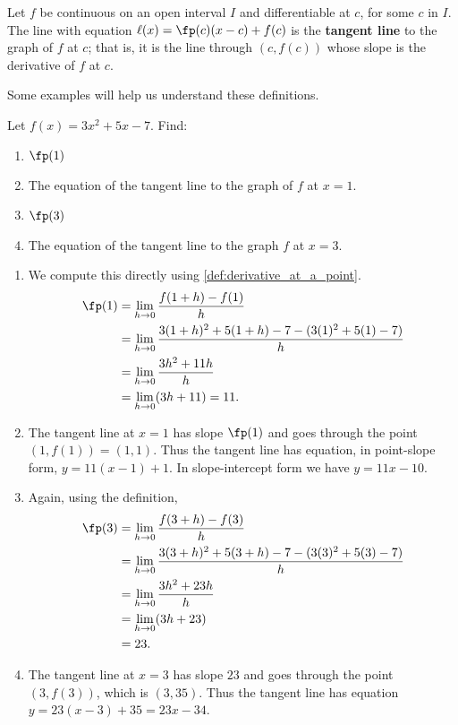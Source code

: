 \begin{definition}\label{def:tangent_line}
Let $f$ be continuous on an open interval $I$ and differentiable at $c$, for some $c$ in $I$. The line with equation $\ell(x) = \fp(c)(x-c)+f(c)$ is the \textbf{tangent line} to the graph of $f$ at $c$; that is, it is the line through $(c,f(c))$ whose slope is the derivative of $f$ at $c$.
\end{definition}


Some examples will help us understand these definitions.

\begin{example}\label{ex_derv_point1}
Let $f(x) = 3x^2+5x-7$. Find: 
\begin{multicols}{2}
	\begin{enumerate}
	\item		$\fp(1)$
	\item		The equation of the tangent line to the graph of $f$ at $x=1$.
	\item		$\fp(3)$
	\item		The equation of the tangent line to the graph $f$ at $x=3$.
	\end{enumerate}
	\end{multicols}
\solution
	\begin{enumerate}
	\item We compute this directly using \autoref{def:derivative_at_a_point}.
		\begin{align*}
			\fp(1) &= \lim_{h\to 0} \frac{f(1+h)-f(1)}{h} \\
				   &= \lim_{h\to 0} \frac{3(1+h)^2+5(1+h)-7 - (3(1)^2+5(1)-7)}{h}\\
				   &= \lim_{h\to 0} \frac{3h^2+11h}{h}\\
				   &= \lim_{h\to 0}(3h+11)=11.%
		\end{align*}
	\item The tangent line at $x=1$ has slope $\fp(1)$ and goes through the point $(1,f(1)) = (1,1)$. Thus the tangent line has equation, in point-slope form, $y = 11(x-1) + 1$. In slope-intercept form we have $y = 11x-10$.
	\item Again, using the definition,
		\begin{align*}
			\fp(3) &= \lim_{h\to 0} \frac{f(3+h)-f(3)}{h} \\
				   &= \lim_{h\to 0} \frac{3(3+h)^2+5(3+h)-7 - (3(3)^2+5(3)-7)}{h} \\
				   &= \lim_{h\to 0} \frac{3h^2+23h}{h}\\
				   &= \lim_{h\to 0}(3h+23)\\
				   &= 23.
		\end{align*}
	\item The tangent line at $x=3$ has slope $23$ and goes through the point $(3,f(3))$, which is $(3,35)$. Thus the tangent line has equation $y=23(x-3)+35 = 23x-34$.
	\end{enumerate}


\end{example}
